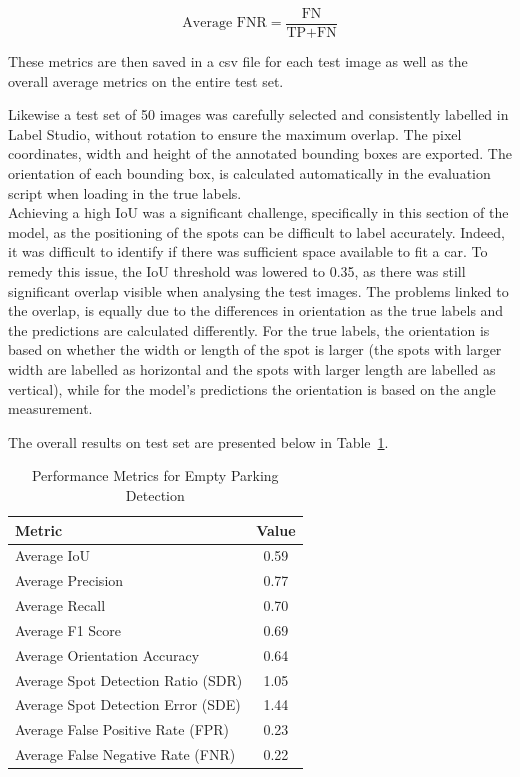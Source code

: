 \[
\text{Average FNR} = \frac{\text{FN}}{\text{TP} + \text{FN}}
\]

These metrics are then saved in a csv file for each test image as well as the overall average metrics on the entire test set.

Likewise a test set of 50 images was carefully selected and consistently labelled in Label Studio, without rotation to ensure the maximum overlap. The pixel coordinates, width and height of the annotated bounding boxes are exported. The orientation of each bounding box, is calculated automatically in the evaluation script when loading in the true labels.\\
Achieving a high IoU was a significant challenge, specifically in this section of the model, as the positioning of the spots can be difficult to label accurately. Indeed, it was difficult to identify if there was sufficient space available to fit a car.
To remedy this issue, the IoU threshold was lowered to 0.35, as there was still significant overlap visible when analysing the test images.
The problems linked to the overlap, is equally due to the differences in orientation as the true labels and the predictions are calculated differently.
For the true labels, the orientation is based on whether the width or length of the spot is larger (the spots with larger width are labelled as horizontal and the spots with larger length are labelled as vertical), while for the model's predictions the orientation is based on the angle measurement.

The overall results on test set are presented below in Table~\ref{tab:metrics2}.


\begin{table}[htbp]
  \centering
  \begin{tabular}{|l|c|}
    \hline
    \textbf{Metric}                    & \textbf{Value} \\ \hline
    Average IoU                        & 0.59           \\ \hline
    Average Precision                  & 0.77           \\ \hline
    Average Recall                     & 0.70           \\ \hline
    Average F1 Score                   & 0.69           \\ \hline
    Average Orientation Accuracy       & 0.64           \\ \hline
    Average Spot Detection Ratio (SDR) & 1.05           \\ \hline
    Average Spot Detection Error (SDE) & 1.44           \\ \hline
    Average False Positive Rate (FPR)  & 0.23           \\ \hline
    Average False Negative Rate (FNR)  & 0.22           \\ \hline
  \end{tabular}
  \caption{Performance Metrics for Empty Parking Detection}
  \label{tab:metrics2}
\end{table}


